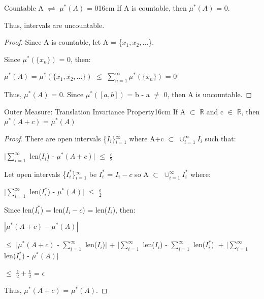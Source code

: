     \vspace{0.5cm}



    \begin{corollary}{Countable A $\rightleftharpoons$ $\mu^*(A)$ = 0}{16cm}
        If A is countable, then $\mu^*(A)$ = 0.

        Thus, intervals are uncountable.
    \end{corollary}

    \begin{proof}
        Since A is countable, let A = \{$x_1,x_2,...$\}.
        
        Since $\mu^*(\{x_n\})$ = 0, then:
        
        \hspace{0.5cm}
        $\mu^*(A)$
        = $\mu^*(\{x_1,x_2,...\})$
        $\leq$ $\sum_{n=1}^{\infty} \mu^*(\{x_n\})$
        = 0

        Thus, $\mu^*(A)$ = 0.
        Since $\mu^*([a,b])$ = b - a $\not =$ 0, then A is uncountable. 
    \end{proof}

    \vspace{0.5cm}



    \begin{wtheorem}{Outer Measure: Translation Invariance Property}{16cm}
        If A $\subset$ $\mathbb{R}$ and c $\in$ $\mathbb{R}$, then
        $\mu^*(A+c)$ = $\mu^*(A)$
    \end{wtheorem}

    \begin{proof}
        There are open intervals \{$I_i$\}$_{i=1}^{\infty}$
        where A+c $\subset$ $\cup_{i=1}^{\infty} I_i$ such that:

        \hspace{0.5cm}
        $|\sum_{i=1}^{\infty}$ len($I_i$) - $\mu^*(A+c)|$
        $\leq$ $\frac{\epsilon}{2}$

        Let open intervals \{$I_i^*$\}$_{i=1}^{\infty}$
        be $I_i^*$ = $I_i-c$ so A $\subset$ $\cup_{i=1}^{\infty} I_i^*$ where:

        \hspace{0.5cm}
        $|\sum_{i=1}^{\infty}$ len($I_i^*$) - $\mu^*(A)|$
        $\leq$ $\frac{\epsilon}{2}$

        Since len($I_i^*$) = len($I_i-c$) = len($I_i$), then:

        \hspace{0.5cm}
        $|\mu^*(A+c) - \mu^*(A)|$

        \hspace{0.5cm}
        $\leq$ $|\mu^*(A+c)$ - $\sum_{i=1}^{\infty}$ len($I_i$)$|$
                + $|\sum_{i=1}^{\infty}$ len($I_i$)
                    - $\sum_{i=1}^{\infty}$ len($I_i^*$)$|$
                + $|\sum_{i=1}^{\infty}$ len($I_i^*$) - $\mu^*(A)|$

        \hspace{0.5cm}
        $\leq$ $\frac{\epsilon}{2} + \frac{\epsilon}{2}$
        = $\epsilon$

        Thus, $\mu^*(A+c)$ = $\mu^*(A)$.
    \end{proof}

